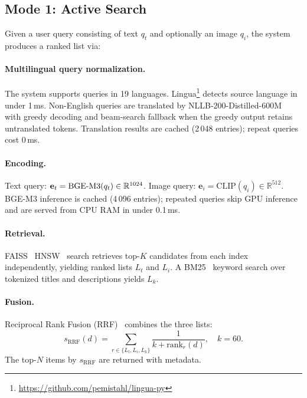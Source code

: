 \subsection{Mode 1: Active Search}
\label{ssec:active}

Given a user query consisting of text $q_t$ and optionally an image $q_i$,
the system produces a ranked list via:

\paragraph{Multilingual query normalization.}
The system supports queries in 19 languages.
Lingua\footnote{\url{https://github.com/pemistahl/lingua-py}} detects source
language in under 1\,ms.
Non-English queries are translated by NLLB-200-Distilled-600M~\cite{costa2022nllb}
with greedy decoding and beam-search fallback when the greedy
output retains untranslated tokens. Translation results are cached (2\,048
entries); repeat queries cost 0\,ms.

\paragraph{Encoding.}
Text query: $\mathbf{e}_t = \mathrm{BGE\text{-}M3}(q_t) \in \mathbb{R}^{1024}$.
Image query: $\mathbf{e}_i = \text{CLIP}(q_i) \in \mathbb{R}^{512}$.
BGE-M3 inference is cached (4\,096 entries); repeated queries skip GPU
inference and are served from CPU RAM in under 0.1\,ms.

\paragraph{Retrieval.}
FAISS~\cite{johnson2019faiss} HNSW~\cite{malkov2018efficient} search retrieves top-$K$ candidates from each index independently,
yielding ranked lists $L_t$ and $L_i$.
A BM25~\cite{robertson1994okapi} keyword search over tokenized titles and descriptions yields $L_k$.

\paragraph{Fusion.}
Reciprocal Rank Fusion (RRF)~\cite{cormack2009rrf} combines the three lists:
\begin{equation}
  s_{\text{RRF}}(d) = \sum_{r \in \{L_t, L_i, L_k\}}
  \frac{1}{k + \text{rank}_r(d)}, \quad k = 60.
  \label{eq:rrf}
\end{equation}
The top-$N$ items by $s_{\text{RRF}}$ are returned with metadata.

